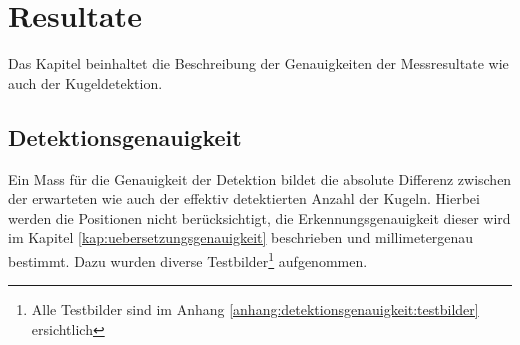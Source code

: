 \chapter{Resultate}\label{kap:resultate}
Das Kapitel beinhaltet die Beschreibung der Genauigkeiten der Messresultate wie auch der Kugeldetektion.

\section{Detektionsgenauigkeit}
Ein Mass für die Genauigkeit der Detektion bildet die absolute Differenz zwischen der erwarteten wie auch der
effektiv detektierten Anzahl der Kugeln. Hierbei werden die Positionen nicht berücksichtigt, die Erkennungsgenauigkeit dieser
wird im Kapitel \ref{kap:uebersetzungsgenauigkeit} beschrieben und millimetergenau bestimmt.
Dazu wurden diverse Testbilder\footnote{Alle Testbilder sind im Anhang \ref{anhang:detektionsgenauigkeit:testbilder} ersichtlich} aufgenommen.

